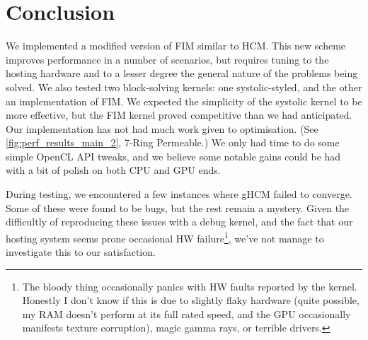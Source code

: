 \documentclass[11pt]{article}       %
\begin{document}

\section{Conclusion} \label{sec:conclusion}

We implemented a modified version of FIM similar to HCM. This new scheme improves performance in a number of scenarios, but requires tuning to the hosting hardware and to a lesser degree the general nature of the problems being solved. We also tested two block-solving kernels: one systolic-styled, and the other an implementation of FIM. We expected the simplicity of the systolic kernel to be more effective, but the FIM kernel proved competitive than we had anticipated. Our implementation has not had much work given to optimisation. (See \autoref{fig:perf_results_main_2}, 7-Ring Permeable.) We only had time to do some simple OpenCL API tweaks, and we believe some notable gains could be had with a bit of polish on both CPU and GPU ends.

During testing, we encountered a few instances where gHCM failed to converge. Some of these were found to be bugs, but the rest remain a mystery. Given the difficultly of reproducing these issues with a debug kernel, and the fact that our hosting system seems prone occasional HW failure\footnote{The bloody thing occasionally panics with HW faults reported by the kernel. Honestly I don't know if this is due to slightly flaky hardware (quite possible, my RAM doesn't perform at its full rated speed, and the GPU occasionally manifests texture corruption), magic gamma rays, or terrible drivers.}, we've not manage to investigate this to our satisfaction.
\end{document}
